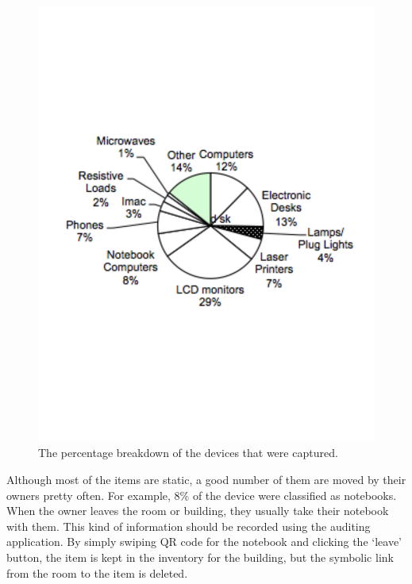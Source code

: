 \begin{figure}[htb!]
\begin{center}
\includegraphics[scale=0.42]{figs/devicecount}
\caption{The percentage breakdown of the devices that were captured.}
\label{fig:devicecount}
\end{center}
\end{figure}

Although most of the items are static, a good number of them are moved by their owners pretty often.  For example, 8\%
of the device were classified as notebooks.  When the owner leaves the room or building, they usually take their notebook
with them.  This kind of information should be recorded using the auditing application.  By simply swiping QR code for the notebook
and clicking the `leave' button, the item is kept in the inventory for the building, but the symbolic link from the 
room to the item is deleted.

